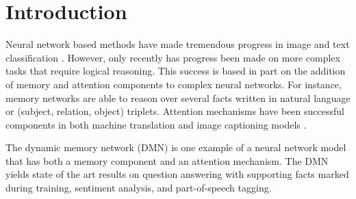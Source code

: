 \documentclass{article}
\begin{document}
 


\newcommand{\babi}{bAbI\xspace}

\begin{abstract} 
Neural network architectures with memory and attention mechanisms exhibit certain reasoning capabilities required for question answering.
One such architecture, the dynamic memory network (DMN), obtained high accuracy on a variety of language tasks.
However, it was not shown whether the architecture achieves strong results for question answering when supporting facts are not marked during training or whether it could be applied to other modalities such as images.
Based on an analysis of the DMN, we propose several improvements to its memory and input modules. Together with these changes we introduce a novel input module for images in order to be able to answer visual questions.
Our new DMN+ model improves the state of the art on both the Visual Question Answering dataset and the \babi-10k text question-answering dataset without supporting fact supervision.
\end{abstract} 

\section{Introduction}
Neural network based methods have made tremendous progress in image and text classification \cite{Krizhevsky2012,Socher2013EMNLP}.
However, only recently has progress been made on more complex tasks that require logical reasoning. This success is based in part on the addition of memory and attention components to complex neural networks. For instance, memory networks \cite{Weston2015} are able to reason over several facts written in natural language or (subject, relation, object) triplets. Attention mechanisms have been successful components in both machine translation \cite{Bahdanau2015,Luong2015} and image captioning models \cite{Xu2015}.

The dynamic memory network \cite{Kumar2015} (DMN) is one example of a neural network model that has both a memory component and an attention mechanism.
The DMN yields state of the art results on question answering with supporting facts marked during training, sentiment analysis, and part-of-speech tagging.
\end{document}
